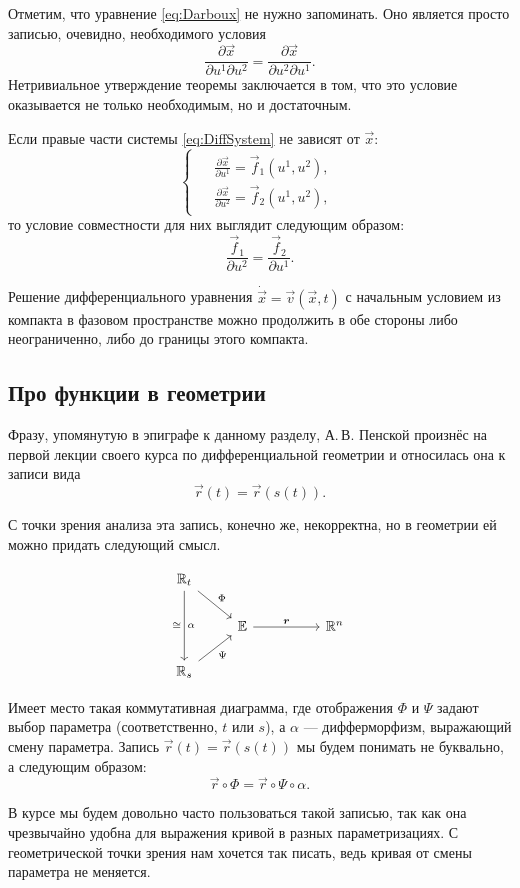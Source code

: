 Отметим, что уравнение \eqref{eq:Darboux} не нужно запоминать. Оно является просто записью, очевидно, необходимого условия
\[
	\frac{\partial\vec{x}}{\partial u^1 \partial u^2} = \frac{\partial\vec{x}}{\partial u^2 \partial u^1}.
\]
Нетривиальное утверждение теоремы заключается в том, что это условие оказывается не только необходимым, но и достаточным.

\begin{example} \label{example:SimpleDiffJointness}
	Если правые части системы \eqref{eq:DiffSystem} не зависят от $\vec{x}$:
	\[
		\begin{cases}
			\begin{aligned}
				&\frac{\partial\vec{x}}{\partial u^1} = \vec{f}_1(u^1, u^2),\\
				&\frac{\partial\vec{x}}{\partial u^2} = \vec{f}_2(u^1, u^2),
			\end{aligned}
		\end{cases}
	\]
	то условие совместности для них выглядит следующим образом:
	\[
		\frac{\vec{f}_1}{\partial u^2} = \frac{\vec{f}_2}{\partial u^1}.
	\]
\end{example}

\begin{theorem}[О продолжении] \label{theorem:ContinuityDifferential}
	Решение дифференциального уравнения $\dot{\vec{x}} = \vec{v}(\vec{x}, t)$ с начальным условием из компакта в фазовом пространстве можно продолжить в обе стороны либо неограниченно, либо до границы этого компакта.
\end{theorem}

\subsection{Про функции в геометрии}

Фразу, упомянутую в эпиграфе к данному разделу, А.\,В. Пенской произнёс на первой лекции своего курса по дифференциальной геометрии и относилась она к записи вида
\[
	\vec{r}(t) = \vec{r}(s(t)).
\]

С точки зрения анализа эта запись, конечно же, некорректна, но в геометрии ей можно придать следующий смысл.

%
\[\begin{tikzcd}
	{\R_t} \\
	& {\mathbb{E}} && {\mathbb{R}^n} \\
	{\R_s}
	\arrow["\Phi", from=1-1, to=2-2]
	\arrow["\vec{r}", from=2-2, to=2-4]
	\arrow["\Psi"', from=3-1, to=2-2]
	\arrow["\homeo" left, "\alpha" right, from=1-1, to=3-1]
\end{tikzcd}\]
%

Имеет место такая коммутативная диаграмма, где отображения $\Phi$ и $\Psi$ задают выбор параметра (соответственно, $t$ или $s$), а $\alpha$ --- дифферморфизм, выражающий смену параметра. Запись $\vec{r}(t) = \vec{r}(s(t))$ мы будем понимать не буквально, а следующим образом:
\[
	\vec{r} \circ \Phi = \vec{r} \circ \Psi \circ \alpha.
\]

В курсе мы будем довольно часто пользоваться такой записью, так как она чрезвычайно удобна для выражения кривой в разных параметризациях. С геометрической точки зрения нам хочется так писать, ведь кривая от смены параметра не меняется.

